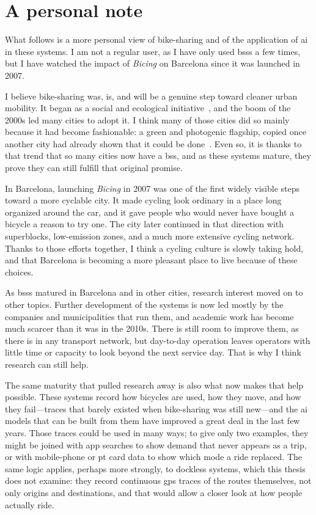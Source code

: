\section{A personal note}

What follows is a more personal view of bike-sharing and of the application of \ac{ai} in these systems. I am not a regular user, as I have only used \acp{bss} a few times, but I have watched the impact of \textit{Bicing} on Barcelona since it was launched in 2007.

I believe bike-sharing was, is, and will be a genuine step toward cleaner urban mobility. It began as a social and ecological initiative~\cite{vanderZee2016}, and the boom of the 2000s led many cities to adopt it. I think many of those cities did so mainly because it had become fashionable: a green and photogenic flagship, copied once another city had already shown that it could be done~\cite{Medard2019}. Even so, it is thanks to that trend that so many cities now have a \ac{bss}, and as these systems mature, they prove they can still fulfill that original promise.

In Barcelona, launching \textit{Bicing} in 2007 was one of the first widely visible steps toward a more cyclable city. It made cycling look ordinary in a place long organized around the car, and it gave people who would never have bought a bicycle a reason to try one. The city later continued in that direction with superblocks, low-emission zones, and a much more extensive cycling network. Thanks to those efforts together, I think a cycling culture is slowly taking hold, and that Barcelona is becoming a more pleasant place to live because of these choices.

As \acp{bss} matured in Barcelona and in other cities, research interest moved on to other topics. Further development of the systems is now led mostly by the companies and municipalities that run them, and academic work has become much scarcer than it was in the 2010s. There is still room to improve them, as there is in any transport network, but day-to-day operation leaves operators with little time or capacity to look beyond the next service day. That is why I think research can still help.

The same maturity that pulled research away is also what now makes that help possible. These systems record how bicycles are used, how they move, and how they fail---traces that barely existed when bike-sharing was still new---and the \ac{ai} models that can be built from them have improved a great deal in the last few years. Those traces could be used in many ways; to give only two examples, they might be joined with app searches to show demand that never appears as a trip, or with mobile-phone or \ac{pt} card data to show which mode a ride replaced. The same logic applies, perhaps more strongly, to dockless systems, which this thesis does not examine: they record continuous \ac{gps} traces of the routes themselves, not only origins and destinations, and that would allow a closer look at how people actually ride.

